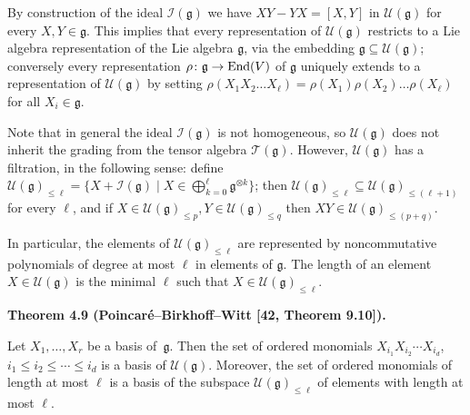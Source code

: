 \documentclass[10pt,a4paper]{article}
\begin{document}
By construction of the ideal $\mathcal{I}(\mathfrak{g})$ we have $XY-YX=[X,Y]$ in $\mathcal{U}(\mathfrak{g})$ for every $X,Y\in\mathfrak{g}$. This implies that every representation of $\mathcal{U}(\mathfrak{g})$ restricts to a Lie algebra representation of the Lie algebra $\mathfrak{g}$, via the embedding $\mathfrak{g}\subseteq\mathcal{U}(\mathfrak{g})$; conversely every representation $\rho\colon\mathfrak{g}\to\textnormal{End}(V)$ of $\mathfrak{g}$ uniquely extends to a representation of $\mathcal{U}(\mathfrak{g})$ by setting $\rho(X_{1}X_{2}\dots X_{\ell})=\rho(X_{1})\rho(X_{2})\dots\rho(X_{\ell})$ for all $X_{i}\in\mathfrak{g}$.





Note that in general the ideal $\mathcal{I}(\mathfrak{g})$ is not homogeneous, so $\mathcal{U}(\mathfrak{g})$ does not inherit the grading from the tensor algebra $\mathcal{T}(\mathfrak{g})$. However, $\mathcal{U}(\mathfrak{g})$ has a filtration, in the following sense: define $\mathcal{U}(\mathfrak{g})_{\leq\ell}=\{X+\mathcal{I}(\mathfrak{g})\mid X\in\bigoplus_{k=0}^{\ell}\mathfrak{g}^{\otimes k}\}$; then $\mathcal{U}(\mathfrak{g})_{\leq\ell}\subseteq\mathcal{U}(\mathfrak{g})_{\leq(\ell+1)}$ for every $\ell$, and if $X\in\mathcal{U}(\mathfrak{g})_{\leq p},Y\in\mathcal{U}(\mathfrak{g})_{\leq q}$ then $XY\in\mathcal{U}(\mathfrak{g})_{\leq(p+q)}$.





In particular, the elements of $\mathcal{U}(\mathfrak{g})_{\leq\ell}$ are represented by noncommutative polynomials of degree at most $\ell$ in elements of $\mathfrak{g}$.
The length of an element $X\in\mathcal{U}(\mathfrak{g})$ is the minimal $\ell$ such that $X\in\mathcal{U}(\mathfrak{g})_{\leq\ell}$.





\par\medskip\noindent\textbf{Theorem 4.9 (Poincaré–Birkhoff–Witt [42, Theorem 9.10]).}\par



Let $X_{1},\dots,X_{r}$ be a basis of $\mathfrak{g}$. Then the set of ordered monomials $X_{i_{1}}X_{i_{2}}\cdots X_{i_{d}}$, $i_{1}\leq i_{2}\leq\cdots\leq i_{d}$ is a basis of $\mathcal{U}(\mathfrak{g})$.
Moreover, the set of ordered monomials of length at most $\ell$ is a basis of the subspace $\mathcal{U}(\mathfrak{g})_{\leq\ell}$ of elements with length at most $\ell$.
\end{document}
